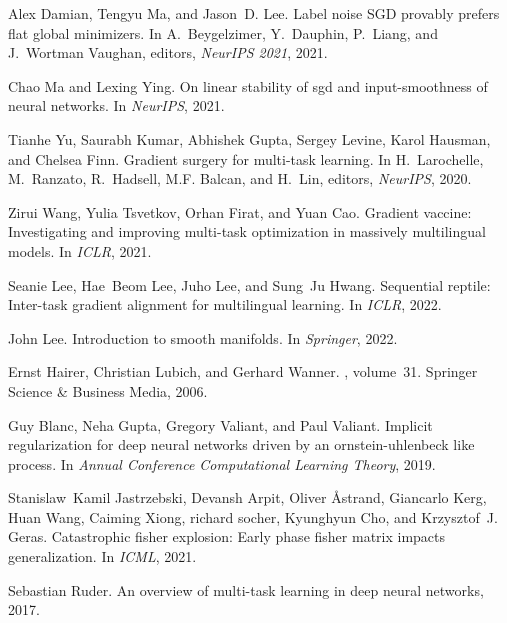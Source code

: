 \documentclass{article}
\begin{document}
\begin{thebibliography}{10}
Alex Damian, Tengyu Ma, and Jason~D. Lee.
\newblock Label noise {SGD} provably prefers flat global minimizers.
\newblock In A.~Beygelzimer, Y.~Dauphin, P.~Liang, and J.~Wortman Vaughan,
  editors, {\em NeurIPS 2021}, 2021.

Chao Ma and Lexing Ying.
\newblock On linear stability of sgd and input-smoothness of neural networks.
\newblock In {\em NeurIPS}, 2021.

Tianhe Yu, Saurabh Kumar, Abhishek Gupta, Sergey Levine, Karol Hausman, and
  Chelsea Finn.
\newblock Gradient surgery for multi-task learning.
\newblock In H.~Larochelle, M.~Ranzato, R.~Hadsell, M.F. Balcan, and H.~Lin,
  editors, {\em NeurIPS}, 2020.

Zirui Wang, Yulia Tsvetkov, Orhan Firat, and Yuan Cao.
\newblock Gradient vaccine: Investigating and improving multi-task optimization
  in massively multilingual models.
\newblock In {\em ICLR}, 2021.

Seanie Lee, Hae~Beom Lee, Juho Lee, and Sung~Ju Hwang.
\newblock Sequential reptile: Inter-task gradient alignment for multilingual
  learning.
\newblock In {\em ICLR}, 2022.

John Lee.
\newblock Introduction to smooth manifolds.
\newblock In {\em Springer}, 2022.

Ernst Hairer, Christian Lubich, and Gerhard Wanner.
, volume~31.
\newblock Springer Science \& Business Media, 2006.

Guy Blanc, Neha Gupta, Gregory Valiant, and Paul Valiant.
\newblock Implicit regularization for deep neural networks driven by an
  ornstein-uhlenbeck like process.
\newblock In {\em Annual Conference Computational Learning Theory}, 2019.

Stanislaw~Kamil Jastrzebski, Devansh Arpit, Oliver {\r{A}}strand, Giancarlo
  Kerg, Huan Wang, Caiming Xiong, richard socher, Kyunghyun Cho, and
  Krzysztof~J. Geras.
\newblock Catastrophic fisher explosion: Early phase fisher matrix impacts
  generalization.
\newblock In {\em ICML}, 2021.

Sebastian Ruder.
\newblock An overview of multi-task learning in deep neural networks, 2017.


\end{thebibliography}
\end{document}
